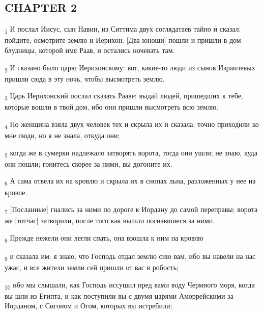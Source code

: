 \subsection{CHAPTER 2}
\begin{tcolorbox}
\textsubscript{1} И послал Иисус, сын Навин, из Ситтима двух соглядатаев тайно и сказал: пойдите, осмотрите землю и Иерихон. [Два юноши] пошли и пришли в дом блудницы, которой имя Раав, и остались ночевать там.
\end{tcolorbox}
\begin{tcolorbox}
\textsubscript{2} И сказано было царю Иерихонскому: вот, какие-то люди из сынов Израилевых пришли сюда в эту ночь, чтобы высмотреть землю.
\end{tcolorbox}
\begin{tcolorbox}
\textsubscript{3} Царь Иерихонский послал сказать Рааве: выдай людей, пришедших к тебе, которые вошли в твой дом, ибо они пришли высмотреть всю землю.
\end{tcolorbox}
\begin{tcolorbox}
\textsubscript{4} Но женщина взяла двух человек тех и скрыла их и сказала: точно приходили ко мне люди, но я не знала, откуда они;
\end{tcolorbox}
\begin{tcolorbox}
\textsubscript{5} когда же в сумерки надлежало затворять ворота, тогда они ушли; не знаю, куда они пошли; гонитесь скорее за ними, вы догоните их.
\end{tcolorbox}
\begin{tcolorbox}
\textsubscript{6} А сама отвела их на кровлю и скрыла их в снопах льна, разложенных у нее на кровле.
\end{tcolorbox}
\begin{tcolorbox}
\textsubscript{7} [Посланные] гнались за ними по дороге к Иордану до самой переправы; ворота же [тотчас] затворили, после того как вышли погнавшиеся за ними.
\end{tcolorbox}
\begin{tcolorbox}
\textsubscript{8} Прежде нежели они легли спать, она взошла к ним на кровлю
\end{tcolorbox}
\begin{tcolorbox}
\textsubscript{9} и сказала им: я знаю, что Господь отдал землю сию вам, ибо вы навели на нас ужас, и все жители земли сей пришли от вас в робость;
\end{tcolorbox}
\begin{tcolorbox}
\textsubscript{10} ибо мы слышали, как Господь иссушил пред вами воду Чермного моря, когда вы шли из Египта, и как поступили вы с двумя царями Аморрейскими за Иорданом, с Сигоном и Огом, которых вы истребили;
\end{tcolorbox}
